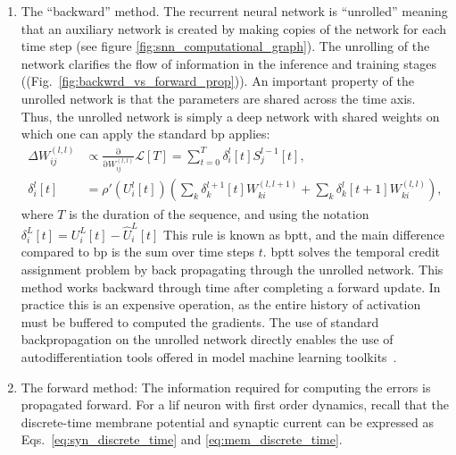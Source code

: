 \documentclass[journal,onecolumn,11pt]{IEEEtran}
\newcommand{\reffig}[1]{{\color{blue!70}(Fig.~\ref{#1})}}
\begin{document}
\begin{enumerate}
\item The ``backward'' method. The recurrent neural network is ``unrolled'' meaning that an auxiliary network is created by making copies of the network for each time step (see figure \ref{fig:snn_computational_graph}). 
The unrolling of the network clarifies the flow of information in the inference and training stages (\reffig{fig:backwrd_vs_forward_prop}).
An important property of the unrolled network is that the parameters are shared across the time axis.
    Thus, the unrolled network is simply a deep network with shared weights on which one can apply the standard \Gls{bp} applies:
%
\begin{equation}\label{eq:bp_deep}
  \begin{split}
    \Delta {W_{ij}^{(l,l)}} &\propto \frac{\mathrm{\partial}}{\mathrm{\partial} W^{(l,l)}_{ij}} \mathcal{L}[T]  = \sum_{t=0}^T \delta_{i}^{l}[t]  S^{l-1}_j[t],\\
    \delta_{i}^{l} [t] & = \rho'\left( U_i^l [t] \right) \left( \sum_k \delta_{k}^{l+1}[t] W_{ki}^{(l,l+1)} + \sum_k \delta_{k}^{l}[t+1] W_{ki}^{(l,l)} \right),
  \end{split}
\end{equation}
%
where $T$ is the duration of the sequence, and using the notation $\delta^{L}_i[t] = U_i^L[t]-\hat{U}_i^L[t]$
This rule is known as \gls{bptt}, and the main difference compared to \gls{bp} is the sum over time steps $t$.
\gls{bptt} solves the temporal credit assignment problem by back propagating through the unrolled network.
This method works backward through time after completing a forward update.
In practice this is an expensive operation, as the entire history of activation must be buffered to computed the gradients.
The use of standard backpropagation on the unrolled network directly enables the use of autodifferentiation tools offered in model machine learning toolkits~\cite{Bellec_etal18_longshor,Shrestha_Orchard18_slayspik,Wozniak_etal18_deepnetw}.\\
\item The forward method: The information required for computing the errors is propagated forward.
  For a \gls{lif} neuron with first order dynamics, recall that the discrete-time membrane potential and synaptic current can be expressed as Eqs.~\eqref{eq:syn_discrete_time} and \eqref{eq:mem_discrete_time}.

\end{enumerate}
\end{document}
